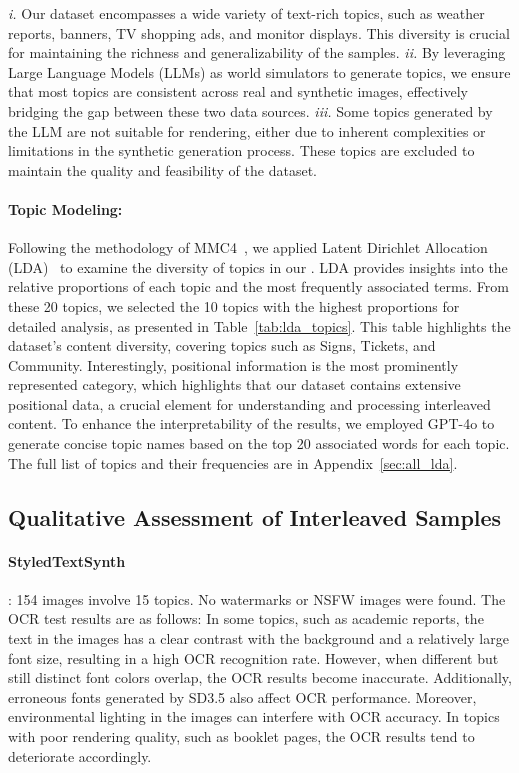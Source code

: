 \emph{i.} Our dataset encompasses a wide variety of text-rich topics, such as weather reports, banners, TV shopping ads, and monitor displays. This diversity is crucial for maintaining the richness and generalizability of the samples.
\emph{ii.} By leveraging Large Language Models (LLMs) as world simulators to generate topics, we ensure that most topics are consistent across real and synthetic images, effectively bridging the gap between these two data sources.
\emph{iii.} Some topics generated by the LLM are not suitable for rendering, either due to inherent complexities or limitations in the synthetic generation process. These topics are excluded to maintain the quality and feasibility of the dataset.


\paragraph{Topic Modeling:}
Following the methodology of MMC4~\cite{mmc4}, we applied Latent Dirichlet Allocation (LDA)~\cite{lda} to examine the diversity of topics in our \DatasetName. 
LDA provides insights into the relative proportions of each topic and the most frequently associated terms.
From these 20 topics, we selected the 10 topics with the highest proportions for detailed analysis, as presented in Table~\ref{tab:lda_topics}.
This table highlights the dataset’s content diversity, covering topics such as Signs, Tickets, and Community. 
Interestingly, positional information is the most prominently represented category, which highlights that our dataset contains extensive positional data, a crucial element for understanding and processing interleaved content.
To enhance the interpretability of the results, we employed GPT-4o to generate concise topic names based on the top 20 associated words for each topic. 
The full list of topics and their frequencies are in Appendix~\ref{sec:all_lda}.











\subsection{Qualitative Assessment of Interleaved Samples}

\paragraph{StyledTextSynth}:
154 images involve 15 topics. 
No watermarks or NSFW images were found. The OCR test results are as follows:
In some topics, such as academic reports, the text in the images has a clear contrast with the background and a relatively large font size, resulting in a high OCR recognition rate. However, when different but still distinct font colors overlap, the OCR results become inaccurate. 
Additionally, erroneous fonts generated by SD3.5 also affect OCR performance. 
Moreover, environmental lighting in the images can interfere with OCR accuracy. 
In topics with poor rendering quality, such as booklet pages, the OCR results tend to deteriorate accordingly.

